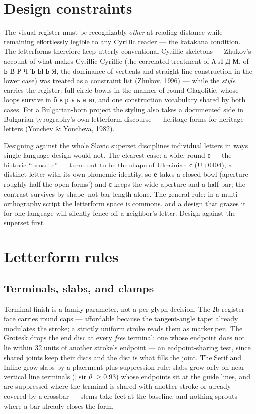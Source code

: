 \documentclass[12pt]{article}
\newcommand{\cz}[1]{{\chu #1}}
\begin{document}
\section{Design constraints}

The visual register must be recognizably \emph{other} at reading distance while remaining effortlessly legible to any Cyrillic reader — the katakana condition. The letterforms therefore keep utterly conventional Cyrillic skeletons — Zhukov's account of what makes Cyrillic Cyrillic (the correlated treatment of \cz{А Л Д М}, of \cz{Б В Р Ч Ъ Ы Ь Я}, the dominance of verticals and straight-line construction in the lower case) was treated as a constraint list (Zhukov, 1996) — while the \emph{style} carries the register: full-circle bowls in the manner of round Glagolitic, whose loops survive in \cz{б в р ъ ь ы ю}, and one construction vocabulary shared by both cases. For a Bulgarian-born project the styling also takes a documented side in Bulgarian typography's own letterform discourse — heritage forms for heritage letters (Yonchev \& Yoncheva, 1982).

Designing against the whole Slavic superset disciplines individual letters in ways single-language design would not. The clearest case: a wide, round \cz{е} — the historic ``broad e'' — turns out to be the shape of Ukrainian \cz{є} (U+0404), a distinct letter with its own phonemic identity, so \cz{е} takes a closed bowl (aperture roughly half the open forms') and \cz{є} keeps the wide aperture and a half-bar; the contrast survives by shape, not bar length alone. The general rule: in a multi-orthography script the letterform space is commons, and a design that grazes it for one language will silently fence off a neighbor's letter. Design against the superset first.

\section{Letterform rules}\label{sec:rules}

\subsection{Terminals, slabs, and clamps}
Terminal finish is a family parameter, not a per-glyph decision. The 2b register face carries round caps — affordable because the tangent-angle taper already modulates the stroke; a strictly uniform stroke reads them as marker pen. The Grotesk drops the end disc at every \emph{free} terminal: one whose endpoint does not lie within 32 units of another stroke's endpoint — an endpoint-sharing test, since shared joints keep their discs and the disc is what fills the joint. The Serif and Inline grow slabs by a placement-plus-suppression rule: slabs grow only on near-vertical line terminals ($\lvert\sin\theta\rvert \ge 0.93$) whose endpoints sit at the guide lines, and are suppressed where the terminal is shared with another stroke or already covered by a crossbar — stems take feet at the baseline, and nothing sprouts where a bar already closes the form.
\end{document}
